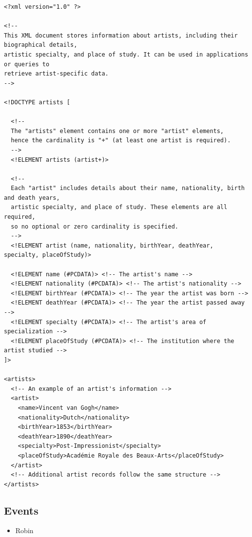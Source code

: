 \documentclass{article} %
\begin{document}
\begin{verbatim}
<?xml version="1.0" ?>

<!-- 
This XML document stores information about artists, including their biographical details, 
artistic specialty, and place of study. It can be used in applications or queries to 
retrieve artist-specific data.
-->

<!DOCTYPE artists [
  
  <!-- 
  The "artists" element contains one or more "artist" elements, 
  hence the cardinality is "+" (at least one artist is required). 
  -->
  <!ELEMENT artists (artist+)>
  
  <!-- 
  Each "artist" includes details about their name, nationality, birth and death years, 
  artistic specialty, and place of study. These elements are all required, 
  so no optional or zero cardinality is specified.
  -->
  <!ELEMENT artist (name, nationality, birthYear, deathYear, specialty, placeOfStudy)>
  
  <!ELEMENT name (#PCDATA)> <!-- The artist's name -->
  <!ELEMENT nationality (#PCDATA)> <!-- The artist's nationality -->
  <!ELEMENT birthYear (#PCDATA)> <!-- The year the artist was born -->
  <!ELEMENT deathYear (#PCDATA)> <!-- The year the artist passed away -->
  <!ELEMENT specialty (#PCDATA)> <!-- The artist's area of specialization -->
  <!ELEMENT placeOfStudy (#PCDATA)> <!-- The institution where the artist studied -->
]>

<artists>
  <!-- An example of an artist's information -->
  <artist>
    <name>Vincent van Gogh</name>
    <nationality>Dutch</nationality>
    <birthYear>1853</birthYear>
    <deathYear>1890</deathYear>
    <specialty>Post-Impressionist</specialty>
    <placeOfStudy>Académie Royale des Beaux-Arts</placeOfStudy>
  </artist>
  <!-- Additional artist records follow the same structure -->
</artists>
\end{verbatim}

\subsection{Events}

\begin{itemize}
    \item Robin
\end{itemize}
\end{document}
